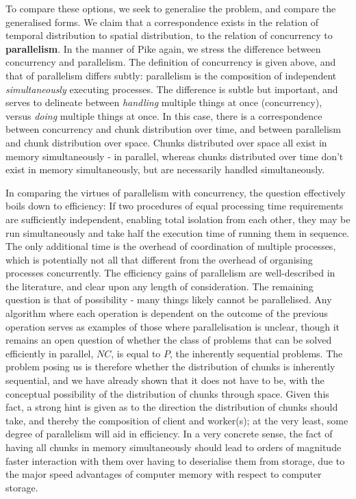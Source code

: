 To compare these options, we seek to generalise the problem, and compare
the generalised forms. We claim that a correspondence exists in the
relation of temporal distribution to spatial distribution, to the
relation of concurrency to \textbf{parallelism}. In the manner of Pike
again, we stress the difference between concurrency and parallelism. The
definition of concurrency is given above, and that of parallelism
differs subtly: parallelism is the composition of independent
\emph{simultaneously} executing processes. The difference is subtle but
important, and serves to delineate between \emph{handling} multiple
things at once (concurrency), versus \emph{doing} multiple things at
once. In this case, there is a correspondence between concurrency and
chunk distribution over time, and between parallelism and chunk
distribution over space. Chunks distributed over space all exist in
memory simultaneously - in parallel, whereas chunks distributed over
time don't exist in memory simultaneously, but are necessarily handled
simultaneously.

In comparing the virtues of parallelism with concurrency, the question
effectively boils down to efficiency: If two procedures of equal
processing time requirements are sufficiently independent, enabling
total isolation from each other, they may be run simultaneously and take
half the execution time of running them in sequence. The only additional
time is the overhead of coordination of multiple processes, which is
potentially not all that different from the overhead of organising
processes concurrently. The efficiency gains of parallelism are
well-described in the literature, and clear upon any length of
consideration. The remaining question is that of possibility - many
things likely cannot be parallelised. Any algorithm where each operation
is dependent on the outcome of the previous operation serves as examples
of those where parallelisation is unclear, though it remains an open
question of whether the class of problems that can be solved efficiently
in parallel, \(NC\), is equal to \(P\), the inherently sequential
problems. The problem posing us is therefore whether the distribution of
chunks is inherently sequential, and we have already shown that it does
not have to be, with the conceptual possibility of the distribution of
chunks through space. Given this fact, a strong hint is given as to the
direction the distribution of chunks should take, and thereby the
composition of client and worker(s); at the very least, some degree of
parallelism will aid in efficiency. In a very concrete sense, the fact
of having all chunks in memory simultaneously should lead to orders of
magnitude faster interaction with them over having to deserialise them
from storage, due to the major speed advantages of computer memory with
respect to computer storage.

